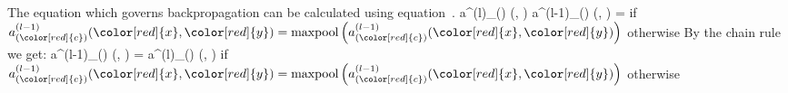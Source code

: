 The equation which governs backpropagation can be calculated using equation~.
\startformula
\frac
    {
        \partial a^{(l)}_{(\color[red]{c})} (\color[red]{x}, \color[red]{y})
    }{
        \partial a^{(l-1)}_{(\color[red]{c})} (\color[red]{x}, \color[red]{y})
    }
=
\startcases
{} \NC if $a^{(l-1)}_{(\color[red]{c})} (\color[red]{x}, \color[red]{y}) = {\rm maxpool}
\left(
    a^{(l-1)}_{(\color[red]{c})} (\color[red]{x}, \color[red]{y})
\right)$ \NR
{} \NC otherwise \NR
\stopcases
\stopformula
By the chain rule we get:
\startplaceformula
\startformula
\frac
    {
        \partial \ell
    }{
        \partial a^{(l-1)}_{(\color[red]{c})} (\color[red]{x}, \color[red]{y})
    }
=
\startcases
\NC \frac
    {
        \partial \ell
    }{
        \partial a^{(l)}_{(\color[red]{c})} (\color[red]{x}, \color[red]{y})
    }
\NC if $a^{(l-1)}_{(\color[red]{c})} (\color[red]{x}, \color[red]{y}) = {\rm maxpool}
\left(
    a^{(l-1)}_{(\color[red]{c})} (\color[red]{x}, \color[red]{y})
\right)$ \NR
{} \NC otherwise \NR
\stopcases
\stopformula
\stopplaceformula